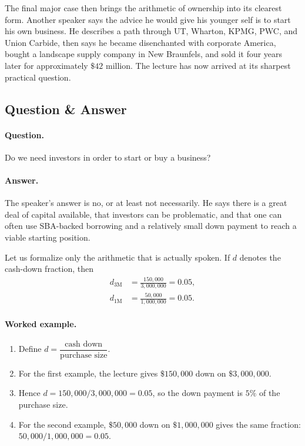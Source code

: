 The final major case then brings the arithmetic of ownership into its clearest form. Another speaker says the advice he would give his younger self is to start his own business. He describes a path through UT, Wharton, KPMG, PWC, and Union Carbide, then says he became disenchanted with corporate America, bought a landscape supply company in New Braunfels, and sold it four years later for approximately \( \$42 \) million. The lecture has now arrived at its sharpest practical question.

\subsection{Question \& Answer}

\paragraph{Question.} Do we need investors in order to start or buy a business?

\paragraph{Answer.} The speaker's answer is no, or at least not necessarily. He says there is a great deal of capital available, that investors can be problematic, and that one can often use SBA-backed borrowing and a relatively small down payment to reach a viable starting position.

Let us formalize only the arithmetic that is actually spoken. If \(d\) denotes the cash-down fraction, then
\begin{align}
d_{3\text{M}} &= \frac{150{,}000}{3{,}000{,}000} = 0.05,\\
d_{1\text{M}} &= \frac{50{,}000}{1{,}000{,}000} = 0.05.
\end{align}

\paragraph{Worked example.}
\begin{enumerate}
\item Define \(d = \dfrac{\text{cash down}}{\text{purchase size}}\).
\item For the first example, the lecture gives \( \$150{,}000 \) down on \( \$3{,}000{,}000 \).
\item Hence \(d = 150{,}000/3{,}000{,}000 = 0.05\), so the down payment is \(5\%\) of the purchase size.
\item For the second example, \( \$50{,}000 \) down on \( \$1{,}000{,}000 \) gives the same fraction:
\(50{,}000/1{,}000{,}000 = 0.05\).
\end{enumerate}

